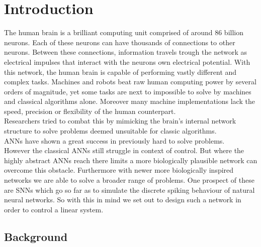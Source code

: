 \chapter{Introduction}


The human brain is a brilliant computing unit comprised of around 86 billion\cite{azevedo_equal_2009} neurons. Each of these neurons can have thousands of connections to other neurons. Between these connections, information travels trough the network as electrical impulses that interact with the neurons own electrical potential. With this network, the human brain is capable of performing vastly different and complex tasks. Machines and robots beat raw human computing power by several orders of magnitude, yet some tasks are next to impossible to solve by machines and classical algorithms alone. Moreover many machine implementations lack the speed, precision or flexibility of the human counterpart.\\
Researchers tried to combat this by mimicking the brain's internal network structure to solve problems deemed unsuitable for classic algorithms.\\
\acp{ANN} have shown a great success in previously hard to solve problems.\\
However the classical \acp{ANN} still struggle in context of control.
But where the highly abstract \acp{ANN} reach there limits a more biologically plausible network can overcome this obstacle.
Furthermore with newer more biologically inspired networks we are able to solve a broader range of problems. One prospect of these are \acp{SNN} which go so far as to simulate the discrete spiking behaviour of natural neural networks. So with this in mind we set out to design such a network in order to control a linear system.


\section{Background}
\label{sec:background}

